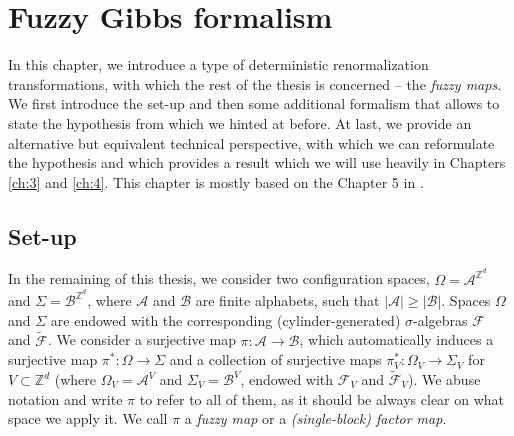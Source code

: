 \documentclass[12pt]{article}
\newcommand{\A}{\mathcal{A}}
\newcommand{\B}{\mathcal{B}}
\newcommand{\F}{\mathcal{F}}
\newcommand{\Z}{\mathbb{Z}}
\newcommand{\ra}{\rightarrow}
\newcommand{\1}{\mathbbm{1}}
\newcommand{\5}{\vspace{0.5cm}}
\renewcommand{\tilde}{\widetilde}
\theoremstyle{definition}
\begin{document}
\section{Fuzzy Gibbs formalism}\label{ch:2}

In this chapter, we introduce a type of deterministic renormalization transformations, with which the rest of the thesis is concerned -- the \textit{fuzzy maps}. We first introduce the set-up and then some additional formalism that allows to state the hypothesis from \cite{EFS} which we hinted at before. At last, we provide an alternative but equivalent technical perspective, with which we can reformulate the hypothesis and which provides a result which we will use heavily in Chapters \ref{ch:3} and \ref{ch:4}. This chapter is mostly based on the Chapter 5 in \cite{Ber}.


\subsection{Set-up}

In the remaining of this thesis, we consider two configuration spaces, $\Omega=\A^{\Z^d}$ and $\Sigma=\B^{\Z^d}$, where $\A$ and $\B$ are finite alphabets, such that $|\A|\geq|\B|$. Spaces $\Omega$ and $\Sigma$ are endowed with the corresponding (cylinder-generated) $\sigma$-algebras $\F$ and $\tilde{\F}$. We consider a surjective map $\pi:\A\ra\B$, which automatically induces a surjective map $\pi^*:\Omega\ra\Sigma$ and a collection of surjective maps $\pi_V^*:\Omega_V\ra\Sigma_V$ for $V\subset\Z^d$ (where $\Omega_V=\A^V$ and $\Sigma_V=\B^V$, endowed with $\F_V$ and $\tilde{\F}_V$). We abuse notation and write $\pi$ to refer to all of them, as it should be always clear on what space we apply it. We call $\pi$ a \textit{fuzzy map} or a \textit{(single-block) factor map}.  \\
\end{document}
